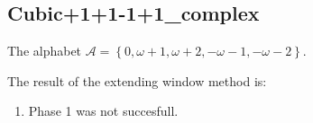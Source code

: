 \subsection{ Cubic+1+1-1+1\_complex }

\label{subsec:Cubic+1+1-1+1complex}

The alphabet $\mathcal{A} =\left\{0, \omega + 1, \omega + 2, -\omega - 1, -\omega - 2\right\}$.

\noindent The result of the extending window method is:
\begin{enumerate}
    \item Phase 1 was not succesfull. 

\end{enumerate}
